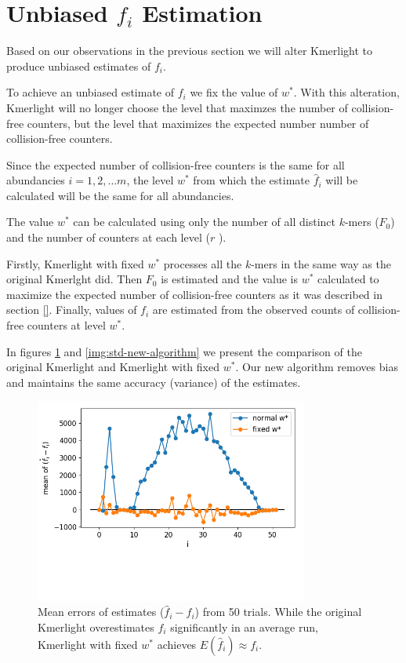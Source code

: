 \section{Unbiased $f_i$ Estimation}
\label{sec:unbiased-estimate}

Based on our observations in the previous section we will alter Kmerlight 
to produce unbiased estimates of $f_i$.

To achieve an unbiased estimate of $f_i$ we fix the value of $w^*$. 
With this alteration, Kmerlight will no longer choose the level
that maximzes the number of collision-free counters, but the level that maximizes
the expected number number of collision-free counters.

Since the expected number of collision-free counters is the same for all abundancies
$i=1,2,\dots m$, the level $w^*$ from which the estimate $\hat f_i$ will be calculated
will be the same for all abundancies.

The value $w^*$ can be calculated using only the number of all distinct
$k$-mers ($F_0$) and the number of counters at each level ($r$ ).

Firstly, Kmerlight with fixed $w^*$ processes all the $k$-mers in the same
way as the original Kmerlght did. Then $F_0$ is estimated and the
value is $w^*$ calculated to maximize the expected number of
collision-free counters as it was described in section \ref{}.
Finally, values of $f_i$ are estimated from the observed counts of 
collision-free counters at level $w^*$.

In figures \ref{img:mean-new-algorithm} and \ref{img:std-new-algorithm} we present the comparison
of the original Kmerlight and Kmerlight with fixed $w^*$. Our new algorithm removes bias
and maintains the same accuracy (variance) of the estimates.


\begin{figure}
\centerline{\includegraphics[width=0.8\textwidth, trim={0cm, 3cm, 0cm, 0cm}, clip]{images/means_comparison.png}}
\caption[Mean error of normal Kmerlight and Kmerlight with fixed $w^*$]{Mean errors of estimates
($\hat f_i - f_i$) from 50 trials. While the original Kmerlight overestimates 
$f_i$ significantly in an average run, Kmerlight with fixed $w^*$ achieves $E(\hat f_i) \approx f_i$.}
\label{img:mean-new-algorithm}
\end{figure}

